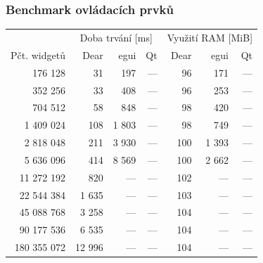 \documentclass[FM,widescreen]{tulpresentation} %
\begin{document}
	\begin{frame}[plain]\frametitle{Benchmark ovládacích prvků}		
		\begin{table}\begin{tabular}{|r||r|r|r||r|r|r|}\hline
				&\multicolumn{3}{c||}{Doba trvání [ms]}&\multicolumn{3}{c|}{Využití RAM [MiB]}\\
				Pčt. widgetů & Dear & egui & Qt & Dear & egui & Qt\\\hline
				176 128 &31 & 197 & — & 96 & 171 & —\\
				352 256 &33 & 408 & — & 96 & 253 & —\\
				704 512 &58 & 848 & — & 98 & 420 & —\\
				1 409 024 &108 & 1 803 & — & 98 & 749 & —\\
				2 818 048 &211 & 3 930 & — & 100 & 1 393 & —\\
				5 636 096 &414 & 8 569 & — & 100 & 2 662 & —\\
				11 272 192 &820 & — & — & 102 & — & —\\
				22 544 384 &1 635 & — & — & 103 & — & —\\
				45 088 768 &3 258 & — & — & 104 & — & —\\
				90 177 536 &6 535 & — & — & 104 & — & —\\
				180 355 072 &12 996 & — & — & 104 & — & —\\\hline
		\end{tabular}\end{table}
	\end{frame}
	
\end{document}
